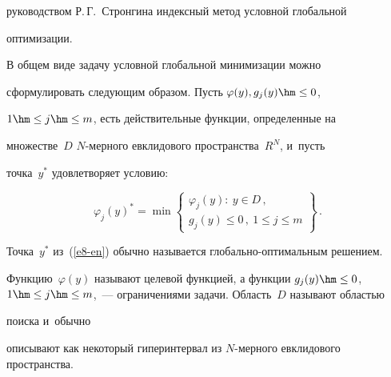 руководством Р.\,Г.~Стронгина индексный метод условной глобальной 


оптимизации. 


  


  В общем виде задачу условной глобальной минимизации можно 


сформулировать следующим образом. Пусть $\varphi(y), g_j(y)\hm\leq0$, 


$1\hm\leq j\hm\leq m$, есть действительные функции, определенные на 


множестве~$D$ $N$-мер\-но\-го евклидового пространства~$R^N$, и~пусть 


точка~$y^*$ удовлетворяет условию: 


  \begin{equation}


  \varphi_j(y)^* = \min\left\{


  \begin{matrix}


  \varphi_j(y):\  y\in D\,,\\


  g_j(y)\leq 0\,,\ 1\leq j\leq m\end{matrix}


  \right\}\,.


  \label{e8-en}


  \end{equation}


    





    





  Точка~$y^*$ из~(\ref{e8-en}) обычно называется глобально-оптимальным решением. 


Функцию~$\varphi(y)$ называют целевой функцией, а функции $g_j(y)\hm\leq0$, $1\hm\leq 


j\hm\leq m$,~--- ограничениями задачи. Область~$D$ называют областью


 поиска и~обычно 


описывают как некоторый гиперинтервал из $N$-мер\-но\-го евклидового пространства. 





